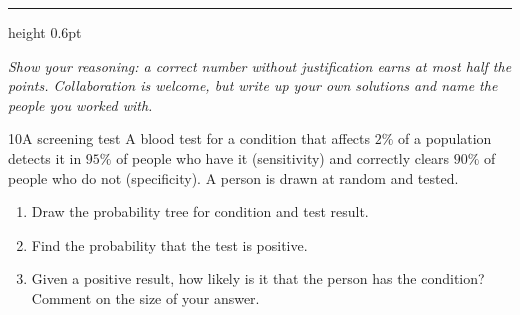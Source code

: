 \vspace{2mm}
\hfill{}

\vspace{4mm}
{\color{rust}\hrule height 0.6pt}
\vspace{2.5mm}
{\small\itshape Show your reasoning: a correct number without justification earns
at most half the points. Collaboration is welcome, but write up your own
solutions and name the people you worked with.}
\vspace{1mm}

\begin{problem}{10}{A screening test}
A blood test for a condition that affects $2\%$ of a population detects it in
$95\%$ of people who have it (sensitivity) and correctly clears $90\%$ of
people who do not (specificity). A person is drawn at random and tested.
\begin{enumerate}
  \item Draw the probability tree for condition and test result.
  \item Find the probability that the test is positive.
  \item Given a positive result, how likely is it that the person has the
        condition? Comment on the size of your answer.
\end{enumerate}
\end{problem}


